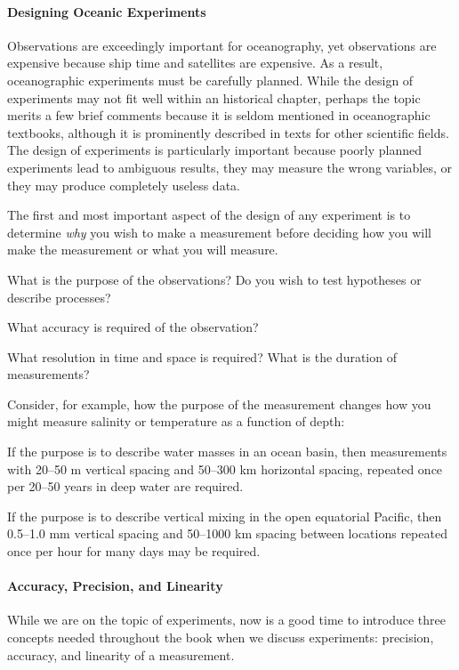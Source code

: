 \paragraph{Designing Oceanic Experiments}
Observations are exceedingly important for
ocean\-ography, yet observations are expensive because ship time and
satellites are expensive. As a result, oceanographic experiments must
be carefully planned. While the design of experiments may not fit well
within an historical chapter, perhaps the topic merits a few brief
comments because it is seldom mentioned in oceanographic textbooks,
although it is prominently described in texts for other scientific
fields. The design of experiments is particularly important because
poorly planned experiments lead to ambiguous results, they may measure
the wrong variables, or they may produce completely useless data.

The first and most important aspect of the design of any experiment is
to determine \textit{why} you wish to make a measurement before
deciding how you will make the measurement or what you will measure.
\begin{enumerate}
\vitem What is the purpose of the observations? Do you wish to test
hypotheses or describe processes?

\vitem What accuracy is required of the observation?

\vitem What resolution in time and space is required? What is the
duration of measurements?
\end{enumerate}
Consider, for example, how the purpose of the measurement changes how
you might measure salinity or temperature as a function of depth:
\begin{enumerate}
\vitem If the purpose is to describe water masses in an ocean basin,
then measurements with 20--50 m vertical spacing and 50--300 km
horizontal spacing, repeated once per 20--50 years in deep water are
required.

\vitem If the purpose is to describe vertical
mixing in the open equatorial Pacific, then
0.5--1.0 mm vertical spacing and 50--1000 km spacing between locations
repeated once per hour for many days may be required.
\end{enumerate}

\paragraph{Accuracy, Precision, and Linearity}
While we are on the topic of experiments, now is a good time to
introduce three concepts needed throughout the book when we discuss
experiments: precision, accuracy, and linearity of a measurement.


